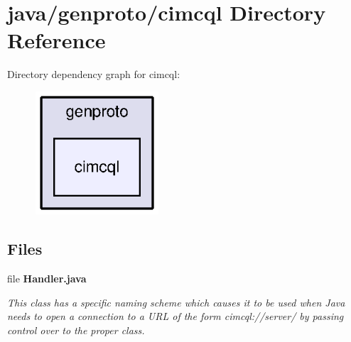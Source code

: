 \section{java/genproto/cimcql Directory Reference}
\label{dir_5c5f5170099a0ff00a58e67a9cac939f}
Directory dependency graph for cimcql\+:\nopagebreak
\begin{figure}[H]
\begin{center}
\leavevmode
\includegraphics[width=130pt]{dir_5c5f5170099a0ff00a58e67a9cac939f_dep}
\end{center}
\end{figure}
\subsection*{Files}
\begin{DoxyCompactItemize}
\item 
file {\bf Handler.\+java}
\begin{DoxyCompactList}\small\item\em This class has a specific naming scheme which causes it to be used when Java needs to open a connection to a U\+R\+L of the form cimcql\+://server/ by passing control over to the proper class. \end{DoxyCompactList}\end{DoxyCompactItemize}
